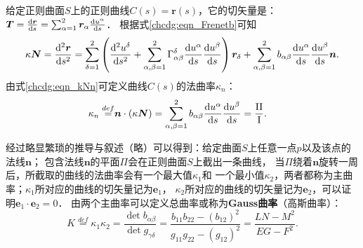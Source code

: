 给定正则曲面$S$上的正则曲线$C(s)=\boldsymbol{r}(s)$，它的切矢量是：
$\boldsymbol{T}=\frac{{\rm d}\boldsymbol{r}}{{\rm d}s}= 
\sum_{\alpha=1}^{2}\boldsymbol{r}_\alpha \frac{{\rm d}u^\alpha}{{\rm d}s}$．
根据式\eqref{chcdg:eqn_Frenetb}可知
\setlength{\mathindent}{0em}
\begin{equation}\label{chcdg:eqn_kNn}
    \kappa \boldsymbol{N} =  \frac{{\rm d}^2\boldsymbol{r}}{{\rm d}s^2}
    = \sum_{\delta=1}^{2}\left( \frac{{\rm d}^2 u^\delta }{{\rm d}s^2} 
    + \sum_{\alpha,\beta=1}^{2}\Gamma^\delta_{\alpha\beta} 
    \frac{{\rm d}u^\alpha}{{\rm d}s}\frac{{\rm d}u^\beta}{{\rm d}s}\right) \boldsymbol{r}_\delta
    +\sum_{\alpha,\beta=1}^{2} b_{\alpha \beta}\frac{{\rm d}u^\alpha}
    {{\rm d}s}\frac{{\rm d}u^\beta}{{\rm d}s} \boldsymbol{n} .
\end{equation}\setlength{\mathindent}{2em}
由式\eqref{chcdg:eqn_kNn}可定义曲线$C(s)$的{\heiti 法曲率}$\kappa_n$：
\begin{align}
    \kappa_n \overset{def}{=} & \boldsymbol{n} \cdot (\kappa \boldsymbol{N})
    =\sum_{\alpha,\beta=1}^{2} b_{\alpha\beta}\frac{{\rm d}u^\alpha}{{\rm d}s}
    \frac{{\rm d}u^\beta}{{\rm d}s}
    =\frac{{\rm II}}{\rm I}.  \label{chcdg:eqn_kn} 
\end{align}


经过略显繁琐的推导与叙述（略）可以得到：给定曲面$S$上任意一点$p$以及该点的法线$\boldsymbol{n}$；
包含法线$\boldsymbol{n}$的平面$\Pi$会在正则曲面$S$上截出一条曲线，
当$\Pi$绕着$\boldsymbol{n}$旋转一周后，所截取的曲线的法曲率会有一个最大值$\kappa_1$和
一个最小值$\kappa_2$，两者都称为{\heiti 主曲率}；$\kappa_1$所对应的曲线的切矢量记为$\boldsymbol{e}_1$，
$\kappa_2$所对应的曲线的切矢量记为$\boldsymbol{e}_2$，可以证明$\boldsymbol{e}_1\cdot \boldsymbol{e}_2=0$．
由两个主曲率可以定义{\heiti 总曲率}或称为{\bfseries \heiti Gauss曲率}（高斯曲率）：
\begin{equation}\label{chcdg:eqn_Gauss-Curvature}
    K \overset{def}{=}\kappa_1 \kappa_2  
    =\frac{\det b_{\alpha\beta}}{\det g_{\gamma\delta}} 
    =\frac{b_{11} b_{22} -(b_{12})^2}{g_{11} g_{22} -(g_{12})^2}
    = \frac{LN-M^2}{EG-F^2} .
\end{equation} %


